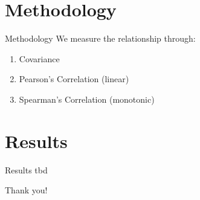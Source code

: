 \documentclass[11pt]{beamer}
\begin{document}

\section{Methodology}
\begin{frame}{Methodology}
We measure the relationship through:
    
    \begin{enumerate}
        \item Covariance
        \item Pearson's Correlation (linear)
        \item Spearman's Correlation (monotonic)
    \end{enumerate}
\end{frame}


\section{Results}
\begin{frame}{Results}
    tbd
\end{frame}


\begin{frame}

\begin{center}
    Thank you!
\end{center}

\end{frame}
\end{document}
